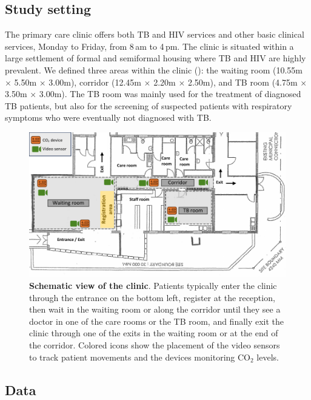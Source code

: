 \documentclass[fleqn,11pt]{wlscirep}
\begin{document}
\subsection{Study setting}

The primary care clinic offers both TB and HIV services and other basic clinical services, Monday to Friday, from 8\,am to 4\,pm. The clinic is situated within a large settlement of formal and semiformal housing where TB and HIV are highly prevalent\cite{Wood2007AMJRCCD,Middelkoop2011JAIDS}. We defined three areas within the clinic (): the waiting room (10.55m $\times$ 5.50m $\times$ 3.00m), corridor (12.45m $\times$ 2.20m $\times$ 2.50m), and TB room (4.75m $\times$ 3.50m $\times$ 3.00m). The TB room was mainly used for the treatment of diagnosed TB patients, but also for the screening of suspected patients with respiratory symptoms who were eventually not diagnosed with TB.

\begin{figure}[!htpb]
    \centering
    \includegraphics{doc/clinic-schematic-annotated-view.pdf}
    \caption{\textbf{Schematic view of the clinic}. Patients typically enter the clinic through the entrance on the bottom left, register at the reception, then wait in the waiting room or along the corridor until they see a doctor in one of the care rooms or the TB room, and finally exit the clinic through one of the exits in the waiting room or at the end of the corridor. Colored icons show the placement of the video sensors to track patient movements and the devices monitoring CO$_2$ levels.}
    \label{fig:floor-plan}
\end{figure}


\subsection{Data}
\end{document}
